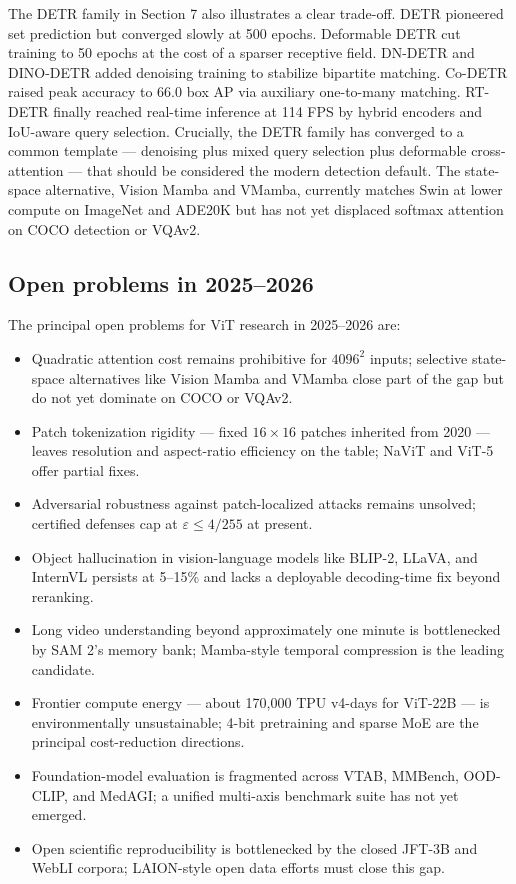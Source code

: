 The DETR family in Section 7 also illustrates a clear trade-off. DETR pioneered set prediction but converged slowly at 500 epochs. Deformable DETR cut training to 50 epochs at the cost of a sparser receptive field. DN-DETR and DINO-DETR added denoising training to stabilize bipartite matching. Co-DETR raised peak accuracy to 66.0 box AP via auxiliary one-to-many matching. RT-DETR finally reached real-time inference at 114 FPS by hybrid encoders and IoU-aware query selection. Crucially, the DETR family has converged to a common template --- denoising plus mixed query selection plus deformable cross-attention --- that should be considered the modern detection default. The state-space alternative, Vision Mamba and VMamba, currently matches Swin at lower compute on ImageNet and ADE20K but has not yet displaced softmax attention on COCO detection or VQAv2.

\subsection{Open problems in 2025--2026}\label{open-problems-in-20252026}

The principal open problems for ViT research in 2025--2026 are:

\begin{itemize}
\tightlist
\item
  Quadratic attention cost remains prohibitive for \(4096^2\) inputs; selective state-space alternatives like Vision Mamba and VMamba close part of the gap but do not yet dominate on COCO or VQAv2.
\item
  Patch tokenization rigidity --- fixed \(16 \times 16\) patches inherited from 2020 --- leaves resolution and aspect-ratio efficiency on the table; NaViT and ViT-5 offer partial fixes.
\item
  Adversarial robustness against patch-localized attacks remains unsolved; certified defenses cap at \(\varepsilon \le 4/255\) at present.
\item
  Object hallucination in vision-language models like BLIP-2, LLaVA, and InternVL persists at 5--15\% and lacks a deployable decoding-time fix beyond reranking.
\item
  Long video understanding beyond approximately one minute is bottlenecked by SAM 2's memory bank; Mamba-style temporal compression is the leading candidate.
\item
  Frontier compute energy --- about 170,000 TPU v4-days for ViT-22B --- is environmentally unsustainable; 4-bit pretraining and sparse MoE are the principal cost-reduction directions.
\item
  Foundation-model evaluation is fragmented across VTAB, MMBench, OOD-CLIP, and MedAGI; a unified multi-axis benchmark suite has not yet emerged.
\item
  Open scientific reproducibility is bottlenecked by the closed JFT-3B and WebLI corpora; LAION-style open data efforts must close this gap.
\end{itemize}

